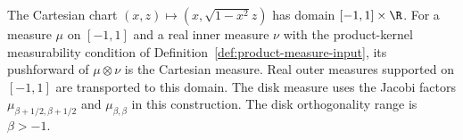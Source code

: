 \begin{definition}
\label{def:disk-measure}
\leanok
The Cartesian chart $(x,z)\mapsto(x,\sqrt{1-x^2}z)$ has domain
$[-1,1]\times\R$. For a measure $\mu$ on $[-1,1]$ and a real inner measure $\nu$ with the product-kernel measurability condition of Definition~\ref{def:product-measure-input},
its pushforward of $\mu\otimes\nu$ is the Cartesian measure.
Real outer measures supported on $[-1,1]$ are transported to this domain.
The disk measure uses the Jacobi factors
$\mu_{\beta+1/2,\beta+1/2}$ and $\mu_{\beta,\beta}$ in this construction.
The disk orthogonality range is $\beta>-1$.
\end{definition}


